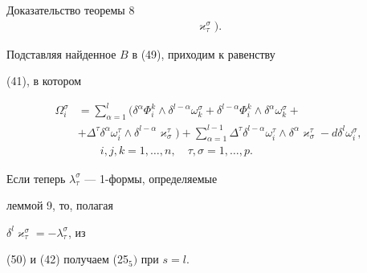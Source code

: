 \begin{pf*}{Доказательство теоремы 8}
\begin{align*}
\varkappa^{\sigma}_{\tau}).


\end{align*}


Подставляя найденное $B$ в (49), приходим к равенству


(41), в котором


\begin{equation}


\begin{split}


\Omega^{\sigma}_i&=


\sum_{\alpha=1}^{l}(\delta^{\alpha}\Phi^k_i\wedge\delta^{l-\alpha}


\omega^{\sigma}_k+


\delta^{l-\alpha}\Phi^k_i\wedge\delta^{\alpha}\omega^{\sigma}_k+\\


%


&+\Delta^{\tau}\delta^{\alpha}\omega^{\tau}_i\wedge\delta^{l-\alpha}


\varkappa^{\tau}_{\sigma})+


\sum_{\alpha=1}^{l-1}


\Delta^{\tau}\delta^{l-\alpha}\omega^{\tau}_i\wedge\delta^{\alpha}


\varkappa_{\sigma}^{\tau}-d\delta^l\omega^{\sigma}_i,\\


&\qquad i,j,k=1,\dotsc,n,\quad \tau,\sigma=1,\dotsc,p.


\end{split}


\end{equation}


Если теперь $\lambda^{\sigma}_{\tau}$ --- 1-формы, определяемые


леммой 9, то, полагая


$\delta^l\varkappa^{\sigma}_{\tau}=-\lambda^{\sigma}_{\tau}$, из


(50) и (42) получаем (25${}_5)$ при $s=l$.


\end{pf*}








